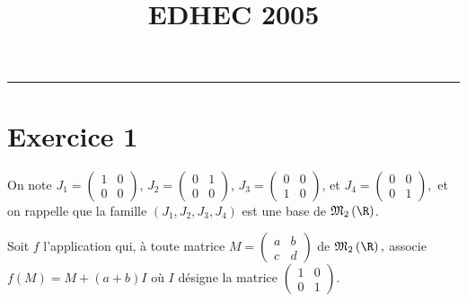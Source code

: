 \documentclass[11pt]{article}%
\title{\bf \vspace{-2cm} EDHEC 2005} %
\author{} %
\date{} %
\begin{document}
\maketitle %
\vspace{-1.4cm}\hrule %
\thispagestyle{fancy}

\vspace*{.2cm}

\section*{Exercice 1}

On note $J_{1} = \left( 
\begin{array}{cc}
1 & 0 \\
0 & 0
\end{array}
\right),\,J_{2} = \left( 
\begin{array}{cc}
0 & 1 \\
0 & 0
\end{array}
\right),\,J_{3} = \left( 
\begin{array}{cc}
0 & 0 \\
1 & 0
\end{array}
\right),\,$et $J_{4} = \left( 
\begin{array}{cc}
0 & 0 \\
0 & 1
\end{array}
\right),$ et on rappelle que la famille $\left(
J_{1},J_{2},J_{3},J_{4}\right) $ est une base de
$\mathfrak{M}_{2}\left( 
\R\right) $.

Soit $f$ l'application qui, à toute matrice $M = \left( 
\begin{array}{cc}
a & b \\
c & d
\end{array}
\right) $ de $\mathfrak{M}_{2}\left( \R\right),$ associe $f\left(
M\right) = M + \left( a + b\right) I$ où $I$ désigne la matrice $\left(

\begin{array}{cc}
1 & 0 \\
0 & 1
\end{array}
\right) $.
\end{document}
